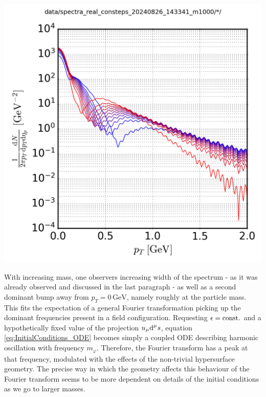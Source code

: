 {\begin{minipage}{\linewidth}
{\begin{minipage}{0.4\linewidth}
                \includegraphics[width=\linewidth]{code/C++/DCCspec/data/images/spectra_real_consteps_20240826_143341_m1000_spec.png}        
            \end{minipage}
        }
        \label{fig:SpecRealConstEps_m1000}
    \end{minipage}
}
With increasing mass, one observers increasing width of the spectrum - as it was already observed and discussed in the last paragraph - as well as a second dominant bump away from $p_T=0\,\text{GeV}$, namely roughly at the particle mass. This fits the expectation of a general Fourier transformation picking up the dominant frequencies present in a field configuration. Requesting ${\epsilon={\text{const.}}}$ and a hypothetically fixed value of the projection ${u_\mu\text{d}^\mu s}$, equation \eqref{eq:InitialConditions_ODE} becomes simply a coupled ODE describing harmonic oscillation with frequency $m_\varphi$. Therefore, the Fourier transform has a peak at that frequency, modulated with the effects of the non-trivial hypersurface geometry. The precise way in which the geometry affects this behaviour of the Fourier transform seems to be more dependent on details of the initial conditions as we go to larger masses.


